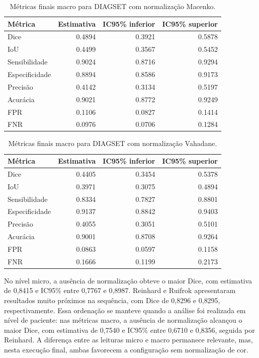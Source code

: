 \begin{table}[!htb]
\centering
\caption{Métricas finais macro para DIAGSET com normalização Macenko.}
\label{tab:results_diagset-macro-macenko}
\small
\begin{tabular}{lrrr}
\toprule
Métrica & Estimativa & IC95\% inferior & IC95\% superior \\
\midrule
Dice & 0.4894 & 0.3921 & 0.5878 \\
IoU & 0.4499 & 0.3567 & 0.5452 \\
Sensibilidade & 0.9024 & 0.8716 & 0.9294 \\
Especificidade & 0.8894 & 0.8586 & 0.9173 \\
Precisão & 0.4142 & 0.3134 & 0.5197 \\
Acurácia & 0.9021 & 0.8772 & 0.9249 \\
FPR & 0.1106 & 0.0827 & 0.1414 \\
FNR & 0.0976 & 0.0706 & 0.1284 \\
\bottomrule
\end{tabular}
\end{table}

\begin{table}[!htb]
\centering
\caption{Métricas finais macro para DIAGSET com normalização Vahadane.}
\label{tab:results_diagset-macro-vahadane}
\small
\begin{tabular}{lrrr}
\toprule
Métrica & Estimativa & IC95\% inferior & IC95\% superior \\
\midrule
Dice & 0.4405 & 0.3454 & 0.5378 \\
IoU & 0.3971 & 0.3075 & 0.4894 \\
Sensibilidade & 0.8334 & 0.7827 & 0.8801 \\
Especificidade & 0.9137 & 0.8842 & 0.9403 \\
Precisão & 0.4055 & 0.3051 & 0.5101 \\
Acurácia & 0.9001 & 0.8708 & 0.9264 \\
FPR & 0.0863 & 0.0597 & 0.1158 \\
FNR & 0.1666 & 0.1199 & 0.2173 \\
\bottomrule
\end{tabular}
\end{table}

No nível micro, a ausência de normalização obteve o maior Dice, com estimativa de 0{,}8415 e IC95\% entre 0{,}7767 e 0{,}8987. Reinhard e Ruifrok apresentaram resultados muito próximos na sequência, com Dice de 0{,}8296 e 0{,}8295, respectivamente. Essa ordenação se manteve quando a análise foi realizada em nível de paciente: nas métricas macro, a ausência de normalização alcançou o maior Dice, com estimativa de 0{,}7540 e IC95\% entre 0{,}6710 e 0{,}8356, seguida por Reinhard. A diferença entre as leituras micro e macro permanece relevante, mas, nesta execução final, ambas favorecem a configuração sem normalização de cor.

